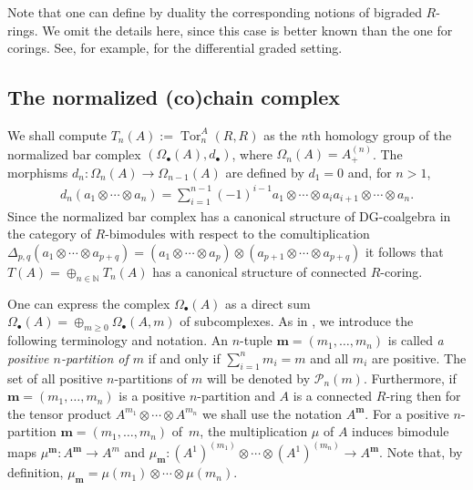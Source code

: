 \documentclass[11pt]{article}
\newcommand{\bs}[1]{\boldsymbol{#1}}
\DeclareMathOperator{\Tor}{Tor}
\newcommand\ot{\otimes}
\newcommand{\Ap}[1]{A_+^{(#1)}}
\def\m{\mu}
\renewcommand{\^}[1]{\mbox{$^{\left( #1 \right)}$}}
\renewcommand{\_}[1]{\mbox{$_{\left( #1 \right)}$}}
\numberwithin{equation}{section}
\begin{document}
Note that one can def\/ine by duality the corresponding notions of bigraded $R$-rings. We omit the details here, since this case is better known than the one for corings. See, for example, \cite{pi} for the dif\/ferential graded setting.

\subsection{The normalized (co)chain complex} \label{sec-t(a)}
We shall compute $T_n(A):=\Tor_n^A(R,R)$ as the $n$th homology group of the normalized bar complex $(\Omega_\bullet(A), d_\bullet)$, where $\Omega_n(A)=\Ap{n}$. The morphisms $d_n\colon \Omega_n(A)\to\Omega_{n-1}(A)$ are def\/ined by $d_1=0$ and, for $n>1$,
\begin{gather*}
d_n(a_1\ot\cdots \ot a_n)=\sum_{i=1}^{n-1}(-1)^{i-1}a_1\ot\cdots \ot a_ia_{i+1}\ot\cdots\ot a_n.
\end{gather*}
Since the normalized bar complex has a canonical structure of DG-coalgebra in the category of $R$-bimodules with respect to the comultiplication $\Delta_{p,q}(a_1\ot\cdots \ot a_{p+q})=(a_1\ot\cdots \ot a_{p})\ot(a_{p+1}\ot\cdots \ot a_{p+q})$ it follows that $T(A)=\oplus_{n \in \mathbb{N}} T_n(A)$ has a canonical structure of connected $R$-coring.
	
One can express the complex $\Omega_\bullet(A)$ as a direct sum $\Omega_\bullet(A)=\oplus_{m \geq 0} \Omega_\bullet(A,m)$ of subcomplexes. As in \cite[Section~1.6]{mst}, we introduce the following terminology and notation. An $n$-tuple $\boldsymbol{m}=(m_1,\dots,m_n)$ is called \textit{a positive $n$-partition of $m$} if and only if $\sum\limits_{i=1}^n m_i=m$ and all $m_i$ are positive. The set of all positive $n$-partitions of $m$ will be denoted by $\mathscr{P}_n(m)$. Furthermore, if $\boldsymbol{m}=(m_1,\dots,m_n)$ is a positive $n$-partition and $A$ is a connected $R$-ring then for the tensor product $A^{m_1}\ot\cdots\ot A^{m_n}$ we shall use the notation $A^{\boldsymbol{m}}$. For a positive $n$-partition $\bs{m}=(m_1,\dots,m_n)$ of~$m$, the multiplication $\m$ of $A$ induces bimodule maps $\mu^{\bs{m}}\colon A^{\bs{m}}\to A^m$ and $\mu_{\bs{m}}\colon (A^1)^{(m_1)}\ot\cdots \ot(A^1)^{(m_n)}\to A^{\bs{m}}$. Note that, by def\/inition, $\mu_{\bs{m}}=\m(m_1)\ot\cdots\ot\m(m_n)$.
\end{document}
